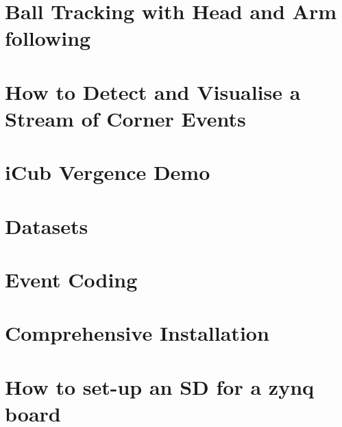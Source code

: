 \documentclass[twoside]{book}
\newcommand{\+}{\discretionary{\mbox{\scriptsize$\hookleftarrow$}}{}{}}
\begin{document}
\chapter{Ball Tracking with Head and Arm following}
\label{md__home_aglover_projects_event-driven_documentation_4balldemo}
\hypertarget{md__home_aglover_projects_event-driven_documentation_4balldemo}{}

\chapter{How to Detect and Visualise a Stream of Corner Events}
\label{md__home_aglover_projects_event-driven_documentation_5corners}
\hypertarget{md__home_aglover_projects_event-driven_documentation_5corners}{}

\chapter{i\+Cub Vergence Demo}
\label{md__home_aglover_projects_event-driven_documentation_6vergence}
\hypertarget{md__home_aglover_projects_event-driven_documentation_6vergence}{}

\chapter{Datasets}
\label{md__home_aglover_projects_event-driven_documentation_datasets}
\hypertarget{md__home_aglover_projects_event-driven_documentation_datasets}{}

\chapter{Event Coding}
\label{md__home_aglover_projects_event-driven_documentation_eventcodecs}
\hypertarget{md__home_aglover_projects_event-driven_documentation_eventcodecs}{}

\chapter{Comprehensive Installation}
\label{md__home_aglover_projects_event-driven_documentation_full_installation}
\hypertarget{md__home_aglover_projects_event-driven_documentation_full_installation}{}

\chapter{How to set-\/up an SD for a zynq board}
\label{md__home_aglover_projects_event-driven_documentation_howtosetupSD}
\hypertarget{md__home_aglover_projects_event-driven_documentation_howtosetupSD}{}

\end{document}
